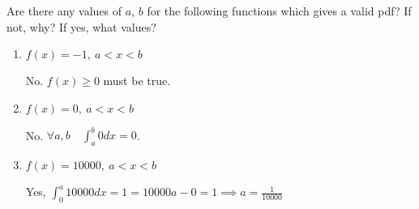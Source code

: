 \question Are there any values of $a$, $b$ for the following functions 
which gives a valid pdf? If not, why? If yes, what values?

\begin{enumerate}[label=(\alph*)]
\item $f(x) = -1,\ a < x < b$
\begin{solution}[1cm]
No. $f(x) \ge 0$ must be true.
\end{solution}
\item $f(x) = 0, \ a<x<b$ 
\begin{solution}[1cm]
No. $\forall a, b \quad \int_{a}^{b} 0 dx = 0$.
\end{solution}
\item $f(x) = 10000,\ a<x<b $
\begin{solution}[1cm]
Yes, $\int_{0}^{a} 10000 dx = 1 = 10000a - 0 = 1 \implies a = \frac{1}{10000}$
\end{solution}
\end{enumerate}
